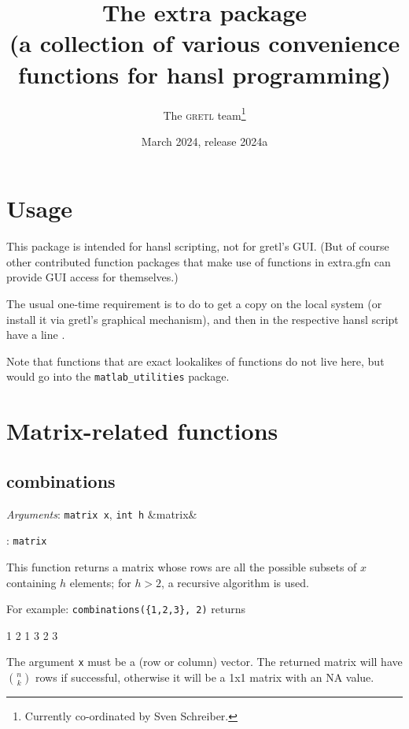 \documentclass[11pt,english]{article}
\newcommand{\noun}[1]{\textsc{#1}}
\newcommand{\ArgRet}[2]{%
  {\it Arguments}: {#1}%
  \ifx&#2&%
  \else
  \par\smallskip\noindent {\it Return type}: \texttt{#2}
  \fi%
  \par\medskip\par%
  }
\begin{document}
\title{The extra package\\
(a collection of various convenience functions for hansl programming) }

\date{March 2024, release 2024a}

\author{The \noun{gretl} team\thanks{Currently co-ordinated by Sven
Schreiber.}}

\maketitle
\tableofcontents{}

\section{Usage}

This package is intended for hansl scripting, not for gretl's GUI.
(But of course other contributed function packages that make use of
functions in extra.gfn can provide GUI access for themselves.)

The usual one-time requirement is to do 
to get a copy on the local system (or install it via gretl's graphical
mechanism), and then in the respective hansl script have a line .

Note that functions that are exact lookalikes of 
functions do not live here, but would go into the
\texttt{matlab\_utilities} package.


\section{Matrix-related functions}

\subsection{combinations}

\ArgRet{\texttt{matrix x}, \texttt{int h}}{matrix} This function
returns a matrix whose rows are all the possible subsets of $x$
containing $h$ elements; for $h>2$, a recursive algorithm is used.

For example: \texttt{combinations(\{1,2,3\}, 2)} returns
\begin{code}
         1   2
         1   3
         2   3
\end{code}

The argument \texttt{x} must be a (row or column) vector. The returned
matrix will have $n \choose k$ rows if successful, otherwise it will be a 1x1
matrix with an NA value.
\end{document}
